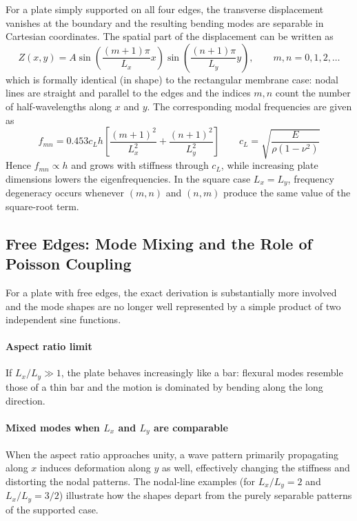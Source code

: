 For a plate simply supported on all four edges, the transverse displacement vanishes at the boundary and the resulting bending modes are separable in Cartesian coordinates. The spatial part of the displacement can be written as
\[
Z(x,y) = A
\sin\left(\frac{(m+1)\pi}{L_x}x\right)
\sin\left(\frac{(n+1)\pi}{L_y}y\right),
\qquad m,n = 0,1,2,\dots
\]
which is formally identical (in shape) to the rectangular membrane case: nodal lines are straight and parallel to the edges and the indices \( m,n \) count the number of half-wavelengths along \( x \) and \( y \). The corresponding modal frequencies are given as
\[
f_{mn}
 = 
0.453c_Lh
\left[
\frac{(m+1)^2}{L_x^2}
+
\frac{(n+1)^2}{L_y^2}\right]
\qquad
c_L = \sqrt{\frac{E}{\rho(1-\nu^2)}}
\]
Hence \( f_{mn} \propto h \) and grows with stiffness through \( c_L \), while increasing plate dimensions lowers the eigenfrequencies. In the square case \( L_x = L_y \), frequency degeneracy occurs whenever \( (m,n) \) and \( (n,m) \) produce the same value of the square-root term.

\subsection{Free Edges: Mode Mixing and the Role of Poisson Coupling}

For a plate with free edges, the exact derivation is substantially more involved and the mode shapes are no longer well represented by a simple product of two independent sine functions.

\paragraph{Aspect ratio limit} If \( L_x/L_y \gg 1 \), the plate behaves increasingly like a bar: flexural modes resemble those of a thin bar and the motion is dominated by bending along the long direction.

\paragraph{Mixed modes when \( L_x \) and \( L_y \) are comparable} When the aspect ratio approaches unity, a wave pattern primarily propagating along \( x \) induces deformation along \( y \) as well, effectively changing the stiffness and distorting the nodal patterns. The nodal-line examples (for \( L_x/L_y = 2 \) and \( L_x/L_y = 3/2 \)) illustrate how the shapes depart from the purely separable patterns of the supported case.

